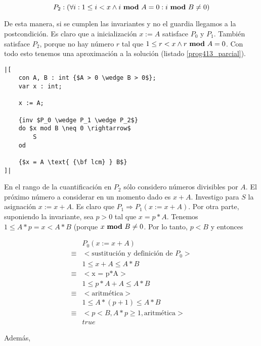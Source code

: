 \documentclass{article}
\begin{document}
$$
P_2: (\forall i : 1 \leq i < x \wedge i \text{ {\bf mod} } A = 0 : i \text{ {\bf mod} } B \neq 0)
$$

De esta manera, si se cumplen las invariantes y no el guardia llegamos a la postcondición.
Es claro que a inicialización $x := A$ satisface $P_0$ y $P_1$. También satisface
$P_2$, porque no hay número $r$ tal que $1 \leq r < x \wedge r \text{ {\bf mod} } A = 0$.
Con todo esto tenemos una aproximación a la solución (listado \ref{prog413_parcial}).

\begin{lstlisting}[float,caption={Solución parcial del ejercicio 4.1.3},label=prog413_parcial]
|[
    con A, B : int {$A > 0 \wedge B > 0$};
    var x : int;

    x := A;

    {inv $P_0 \wedge P_1 \wedge P_2$}
    do $x mod B \neq 0 \rightarrow$
        S
    od

    {$x = A \text{ {\bf lcm} } B$}
]|
\end{lstlisting}

En el rango de la cuantificación en $P_2$ sólo considero números divisibles por $A$.
El próximo número a considerar en un momento dado es $x + A$. Investigo para $S$ la
asignación $x := x + A$. Es claro que $P_1 \Rightarrow P_1(x := x + A)$. Por otra parte,
suponiendo la invariante, sea $p > 0$ tal que $x=p*A$. Tenemos $1 \leq A*p = x < A*B$ (porque
$x \text{ {\bf mod} } B \neq 0$. Por lo tanto, $p < B$ y entonces

\begin{align*}
 & P_0(x := x + A) \\
 \equiv & <\text{sustitución y definición de } P_0> \\
 & 1 \leq x + A \leq A*B \\
 \equiv & <\text{x = p*A}> \\
 & 1 \leq p*A + A \leq A*B \\
 \equiv & <\text{aritmética}> \\
 & 1 \leq A*(p+1) \leq A*B \\
 \equiv & <p < B, A*p \geq 1, \text{aritmética}> \\
 & true
\end{align*}

Además,
\end{document}
